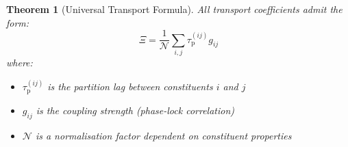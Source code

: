 \documentclass[twocolumn,10pt,aps,prd,superscriptaddress,nofootinbib]{revtex4-2}
\newtheorem{theorem}{Theorem}[section]
\theoremstyle{remark}
\newcommand{\tauP}{\tau_{\mathrm{p}}}
\newcommand{\Gij}{g_{ij}}
\newcommand{\Norm}{\mathcal{N}}
\newcommand{\Transp}{\Xi}
\begin{document}
\begin{theorem}[Universal Transport Formula]
\label{thm:universal_transport}
All transport coefficients admit the form:
\begin{equation}
\Transp = \frac{1}{\Norm} \sum_{i,j} \tauP^{(ij)} \Gij
\label{eq:universal_transport}
\end{equation}
where:
\begin{itemize}
\item $\tauP^{(ij)}$ is the partition lag between constituents $i$ and $j$
\item $\Gij$ is the coupling strength (phase-lock correlation)
\item $\Norm$ is a normalisation factor dependent on constituent properties
\end{itemize}
\end{theorem}
\end{document}
